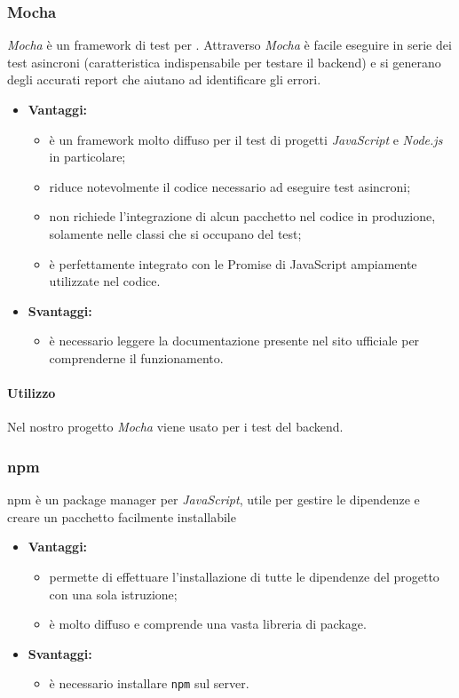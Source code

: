 		\subsubsection{Mocha}
		\textit{Mocha} è un framework di test per . Attraverso \textit{Mocha} è facile eseguire in serie dei test asincroni (caratteristica indispensabile per testare il backend) e si generano degli accurati report che aiutano ad identificare gli errori.

			\begin{itemize}
				\item \textbf{Vantaggi:}
					\begin{itemize}
						\item è un framework molto diffuso per il test di progetti \textit{JavaScript} e \textit{Node.js} in particolare;
						\item riduce notevolmente il codice necessario ad eseguire test asincroni;
						\item non richiede l'integrazione di alcun pacchetto nel codice in produzione, solamente nelle classi che si occupano del test;
						\item è perfettamente integrato con le Promise di JavaScript ampiamente utilizzate nel codice.
					\end{itemize}
				\item \textbf{Svantaggi:}
					\begin{itemize}
						\item è necessario leggere la documentazione presente nel sito ufficiale per comprenderne il funzionamento.
					\end{itemize}
			\end{itemize}
			\paragraph{Utilizzo}
			Nel nostro progetto \textit{Mocha} viene usato per i test del backend.


			\subsubsection{npm}
			npm è un package manager per \textit{JavaScript}, utile per gestire le dipendenze e creare un pacchetto facilmente installabile

				\begin{itemize}
					\item \textbf{Vantaggi:}
						\begin{itemize}
							\item permette di effettuare l'installazione di tutte le dipendenze del progetto con una sola istruzione;
							\item è molto diffuso e comprende una vasta libreria di package.
						\end{itemize}
					\item \textbf{Svantaggi:}
						\begin{itemize}
							\item è necessario installare \texttt{npm} sul server.
						\end{itemize}
				\end{itemize}
